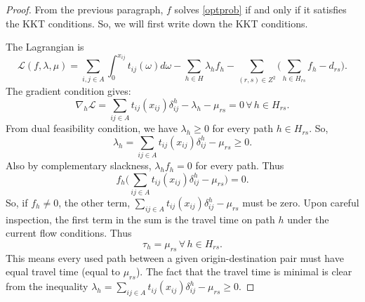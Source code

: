 \begin{proof}
	From the previous paragraph, $f$ solves \eqref{optprob} if and
	only if it satisfies the KKT conditions. So, we will first write
	down the KKT conditions.

	The Lagrangian is
	\[
		\mathcal{L}(f, \lambda, \mu) =
			\sum_{i,j\in A}\int_{0}^{x_{ij}}t_{ij}(\omega)d\omega
			-\sum_{h\in H} \lambda_h f_h -
			\sum_{(r,s)\in Z^2}\Big(\sum_{h\in H_{rs}} f_h - d_{rs}\Big).
	\]
	The gradient condition gives:
	\[
		\nabla_h \mathcal{L} = \sum_{ij\in A}t_{ij}(x_{ij})\delta_{ij}^h
		- \lambda_h - \mu_{rs} = 0\, \forall \, h\in H_{rs}.
	\]
	From dual feasibility condition, we have $\lambda_h\geq 0$ for
	every path $h\in H_{rs}$. So,
	\[
		\lambda_h = \sum_{ij\in A}t_{ij}(x_{ij})\delta_{ij}^h
		-\mu_{rs} \geq 0.
	\]
	Also by complementary slackness, $\lambda_h f_h = 0$ for
	every path. Thus
	\[
		f_h\Big( \sum_{ij\in A}t_{ij}(x_{ij})\delta_{ij}^h
		-\mu_{rs}\Big) = 0.
	\]
	So, if $f_h\neq 0$, the other term, $\sum_{ij\in A}t_{ij}(x_{ij})\delta_{ij}^h -\mu_{rs}$
	must be zero. Upon careful inspection, the first term in the sum
	is the travel time on path $h$ under the current flow
	conditions.
	Thus
	\[
		\tau_h = \mu_{rs}\, \forall\, h\in H_{rs}.
	\]
	This means every used path between a given origin-destination
	pair must have equal travel time (equal to $\mu_{rs}$).
	The fact that the travel time is minimal is clear from the
	inequality $\lambda_h = \sum_{ij\in A}t_{ij}(x_{ij})\delta_{ij}^h
		-\mu_{rs} \geq 0$.
\end{proof}
